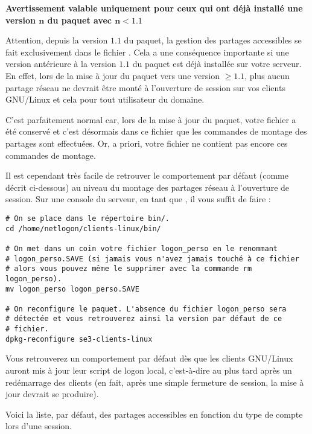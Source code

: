 \begin{alerte}
\begin{center}
\textbf{Avertissement valable uniquement pour ceux qui ont déjà
installé une version $\bm{n}$ du paquet avec
$\bm{n < 1.1}$}
\end{center}

Attention, depuis la version $1.1$ du paquet, la gestion des
partages accessibles se fait exclusivement dans le fichier
. Cela a une conséquence importante
si une version antérieure à la version $1.1$ du paquet est déjà
installée sur votre serveur. En effet, lors de la mise à jour 
du paquet vers une version
$\geq 1.1$, plus aucun partage réseau ne devrait être
monté à l'ouverture de session sur vos clients GNU/Linux
et cela pour tout utilisateur du domaine. 

C'est parfaitement normal car,
lors de la mise à jour du paquet, votre fichier 
 a été conservé et c'est désormais dans
ce fichier que les commandes de montage des partages sont
effectuées. Or, a priori, votre fichier 
ne contient pas encore ces commandes de montage.

Il est cependant très facile de retrouver le comportement
par défaut (comme décrit ci-dessous)
au niveau du montage des partages réseau à l'ouverture de session.
Sur une console du serveur, en tant que , il
vous suffit de faire :
%
\begin{lstlisting}
# On se place dans le répertoire bin/.
cd /home/netlogon/clients-linux/bin/

# On met dans un coin votre fichier logon_perso en le renommant
# logon_perso.SAVE (si jamais vous n'avez jamais touché à ce fichier
# alors vous pouvez même le supprimer avec la commande rm logon_perso).
mv logon_perso logon_perso.SAVE

# On reconfigure le paquet. L'absence du fichier logon_perso sera
# détectée et vous retrouverez ainsi la version par défaut de ce 
# fichier.
dpkg-reconfigure se3-clients-linux
\end{lstlisting}
%
Vous retrouverez un comportement par défaut dès que les clients GNU/Linux
auront mis à jour leur script de logon local, c'est-à-dire au plus tard
après un redémarrage des clients (en fait, après une simple
fermeture de session, la mise à jour devrait se produire).
\end{alerte}

Voici la liste, par défaut, des partages
accessibles en fonction du type de compte lors d'une session.

